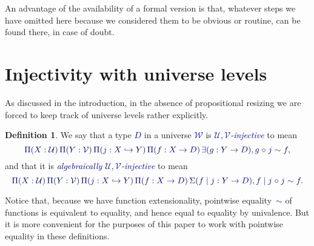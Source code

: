 \documentclass[10pt]{article}
\newcommand{\db}{\textcolor{darkblue}}
\newcommand{\emb}{\hookrightarrow}
\newcommand{\df}[1]{\emph{\db{#1}}}
\newcommand{\m}[1]{\db{$#1$}}
\newcommand{\M}[1]{\[\db{#1}\]}
\newcommand{\comp}{\mathrel{\circ}}
\newcommand{\U}{\mathcal{U}}
\newcommand{\V}{\mathcal{V}}
\newcommand{\W}{\mathcal{W}}
\theoremstyle{definition}
\newtheorem{definition}[numbered]{Definition}
\begin{document}
An advantage of the availability of a formal version is that, whatever
steps we have omitted here because we considered them to be
obvious or routine, can be found there, in case of doubt.


\section{Injectivity with universe levels}

As discussed in the introduction, in the absence of propositional
resizing we are forced to keep track of universe levels rather
explicitly.
\begin{definition}
We say that a type \m{D} in a universe \m{\W} is \df{\m{\U,\V}-injective}
to mean
%
\M{ \Pi(X : \U)\, \Pi(Y : \V)\, \Pi (j : X \emb Y)\, \Pi(f : X \to D)\, \exists (g :
  Y \to D), g \comp j \sim f,
}
%
and that it is \df{algebraically \m{\U,\V}-injective} to mean
%
\M{
  \Pi(X : \U) \,\Pi(Y : \V)\,
  \Pi (j : X \emb Y) \, \Pi(f : X \to D) \, \Sigma (f \mid j : Y \to D),
  f \mid j \comp j \sim f.
}
%
\end{definition}
\noindent Notice that, because we have function extensionality, pointwise
equality~\m{\sim} of functions is equivalent to equality, and
hence equal to equality by univalence. But it is more convenient for
the purposes of this paper to work with pointwise equality in these
definitions.
\end{document}
